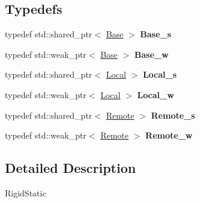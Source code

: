 \subsection*{\-Typedefs}
\begin{DoxyCompactItemize}
\item 
\hypertarget{namespaceNeb_1_1Actor_1_1RigidStatic_aafb57e813fedd22feec5645a6eec9575}{typedef std\-::shared\-\_\-ptr$<$ \hyperlink{classNeb_1_1Actor_1_1RigidStatic_1_1Base}{\-Base} $>$ {\bfseries \-Base\-\_\-s}}\label{namespaceNeb_1_1Actor_1_1RigidStatic_aafb57e813fedd22feec5645a6eec9575}

\item 
\hypertarget{namespaceNeb_1_1Actor_1_1RigidStatic_a9c31d6e88293c389e07aa3160c063c65}{typedef std\-::weak\-\_\-ptr$<$ \hyperlink{classNeb_1_1Actor_1_1RigidStatic_1_1Base}{\-Base} $>$ {\bfseries \-Base\-\_\-w}}\label{namespaceNeb_1_1Actor_1_1RigidStatic_a9c31d6e88293c389e07aa3160c063c65}

\item 
\hypertarget{namespaceNeb_1_1Actor_1_1RigidStatic_abddae42ba492adf5aa94468ad630395c}{typedef std\-::shared\-\_\-ptr$<$ \hyperlink{classNeb_1_1Actor_1_1Local}{\-Local} $>$ {\bfseries \-Local\-\_\-s}}\label{namespaceNeb_1_1Actor_1_1RigidStatic_abddae42ba492adf5aa94468ad630395c}

\item 
\hypertarget{namespaceNeb_1_1Actor_1_1RigidStatic_aa58f9cacc9a0d9873835205217d9ac72}{typedef std\-::weak\-\_\-ptr$<$ \hyperlink{classNeb_1_1Actor_1_1Local}{\-Local} $>$ {\bfseries \-Local\-\_\-w}}\label{namespaceNeb_1_1Actor_1_1RigidStatic_aa58f9cacc9a0d9873835205217d9ac72}

\item 
\hypertarget{namespaceNeb_1_1Actor_1_1RigidStatic_a0dd8eba43fc31137f07a60a01d0ede2f}{typedef std\-::shared\-\_\-ptr$<$ \hyperlink{classNeb_1_1Actor_1_1Remote}{\-Remote} $>$ {\bfseries \-Remote\-\_\-s}}\label{namespaceNeb_1_1Actor_1_1RigidStatic_a0dd8eba43fc31137f07a60a01d0ede2f}

\item 
\hypertarget{namespaceNeb_1_1Actor_1_1RigidStatic_aaf645f9e03059e6a7d6cf48b18acbff1}{typedef std\-::weak\-\_\-ptr$<$ \hyperlink{classNeb_1_1Actor_1_1Remote}{\-Remote} $>$ {\bfseries \-Remote\-\_\-w}}\label{namespaceNeb_1_1Actor_1_1RigidStatic_aaf645f9e03059e6a7d6cf48b18acbff1}

\end{DoxyCompactItemize}


\subsection{\-Detailed \-Description}
\-Rigid\-Static 